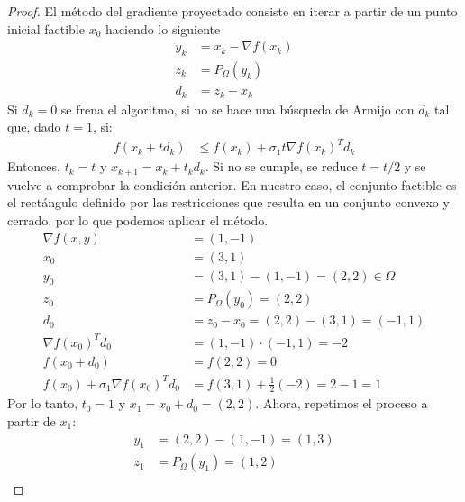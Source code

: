 \documentclass{article}
\begin{document}
\begin{proof}
    El método del gradiente proyectado consiste en iterar a partir de un punto inicial factible \( x_0 \) haciendo lo siguiente \begin{align*}
        y_k & = x_k - \nabla f(x_k) \\
        z_k & = P_{\Omega}(y_k)     \\
        d_k & = z_k - x_k
    \end{align*}
    Si \( d_k = 0 \) se frena el algoritmo, si no se hace una búsqueda de Armijo con \( d_k \) tal que, dado \( t = 1 \), si: \begin{align*}
        f(x_k + t d_k) & \leq f(x_k) + \sigma_1 t {\nabla f(x_k)}^T d_k
    \end{align*}
    Entonces, \( t_k = t \) y \( x_{k+1} = x_k + t_k d_k \). Si no se cumple, se reduce \( t = t/2 \) y se vuelve a comprobar la condición anterior.
    En nuestro caso, el conjunto factible es el rectángulo definido por las restricciones que resulta en un conjunto convexo y cerrado, por lo que podemos aplicar el método.\begin{align*}
        \nabla f(x,y)                           & = (1, -1)                              \\
        x_0                                     & = (3,1)                                \\
        y_0                                     & = (3,1) - (1,-1) = (2,2) \in \Omega    \\
        z_0                                     & = P_{\Omega}(y_0) = (2,2)              \\
        d_0                                     & = z_0 - x_0 = (2,2) - (3,1) = (-1,1)   \\
        {\nabla f(x_0)}^T d_0                   & = (1,-1) \cdot (-1,1) = -2             \\
        f(x_0 + d_0)                            & = f(2,2) = 0                           \\
        f(x_0) + \sigma_1 {\nabla f(x_0)}^T d_0 & = f(3,1) + \frac{1}{2}(-2) = 2 - 1 = 1
    \end{align*}
    Por lo tanto, \( t_0 = 1 \) y \( x_1 = x_0 + d_0 = (2,2) \). Ahora, repetimos el proceso a partir de \( x_1 \): \begin{align*}
        y_1                                     & = (2,2) - (1,-1) = (1,3)                                    \\
        z_1                                     & = P_{\Omega}(y_1) = (1,2)                                   \\

\end{align*}
\end{proof}
\end{document}

